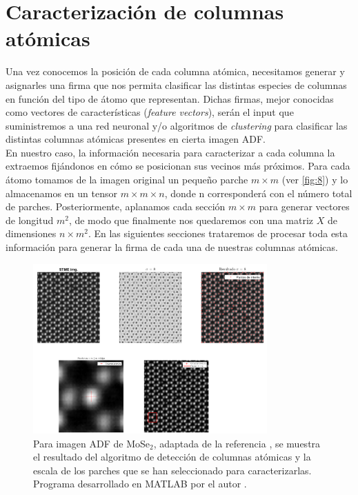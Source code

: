 \section{Caracterización de columnas atómicas}

Una vez conocemos la posición de cada columna atómica, necesitamos generar y asignarles una firma que nos permita clasificar las distintas especies de columnas en función del tipo de átomo que representan. Dichas firmas, mejor conocidas como vectores de características (\textit{feature vectors}), serán el input que suministremos a una red neuronal y/o algoritmos de \textit{clustering} para clasificar las distintas columnas atómicas presentes en cierta imagen ADF.\\

En nuestro caso, la información necesaria para caracterizar a cada columna la extraemos fijándonos en cómo se posicionan sus vecinos más próximos. Para cada átomo tomamos de la imagen original un pequeño parche $m \times m$ (ver \autoref{fig:8}) y lo almacenamos en un tensor $m \times m \times n$, donde n corresponderá con el número total de parches. Posteriormente, aplanamos cada sección $m \times m$ para generar vectores de longitud $m^2$, de modo que finalmente nos quedaremos con una matriz $X$ de dimensiones $n \times m^2$. En las siguientes secciones trataremos de procesar toda esta información para generar la firma de cada una de nuestras columnas atómicas.

\begin{figure}[h!]
    \centering
    \includegraphics[width=0.8\textwidth]{fig/Fig8.png}
    \caption{Para imagen ADF de MoSe$_2$, adaptada de la referencia \cite{ml}, se muestra el resultado del algoritmo de detección de columnas atómicas y la escala de los parches que se han seleccionado para caracterizarlas. Programa desarrollado en MATLAB por el autor \cite{repo}.}
    \label{fig:8}
\end{figure}

